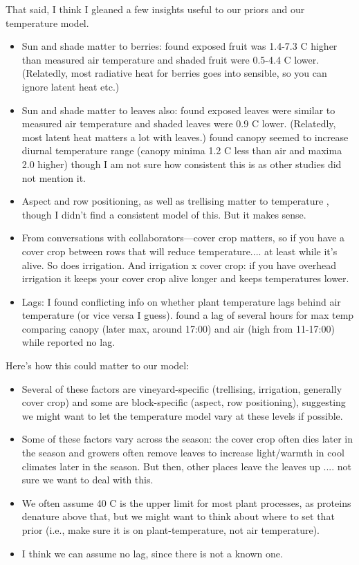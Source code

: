 \documentclass[11pt,letter]{article}
\newenvironment{smitemize}{
\begin{itemize}
  \setlength{\itemsep}{0pt}
  \setlength{\parskip}{0.8pt}
  \setlength{\parsep}{0pt}}
{\end{itemize}
}
\begin{document}
That said, I think I gleaned a few insights useful to our priors and our temperature model. 

\begin{smitemize}
\item Sun and shade matter to berries: \citet{millar1972} found exposed fruit was 1.4-7.3 C higher than measured air temperature and shaded fruit were 0.5-4.4 C lower. (Relatedly, most radiative heat for berries goes into sensible, so you can ignore latent heat etc.)
\item Sun and shade matter to leaves also: \citet{millar1972} found exposed leaves were similar to measured air temperature and shaded leaves were 0.9 C lower. (Relatedly, most latent heat matters a lot with leaves.) \citet{pena2020} found canopy seemed to increase diurnal temperature range (canopy minima 1.2 C less than air and maxima 2.0 higher) though I am not sure how consistent this is as other studies did not mention it. 
\item Aspect and row positioning, as well as trellising matter to temperature \citep{costa2019}, though I didn't find a consistent model of this. But it makes sense.
\item From conversations with collaborators---cover crop matters, so if you have a cover crop between rows that will reduce temperature.... at least while it's alive. So does irrigation. And irrigation x cover crop: if you have overhead irrigation it keeps your cover crop alive longer and keeps temperatures lower.
\item Lags: I found conflicting info on whether plant temperature lags behind air temperature (or vice versa I guess). \citet{costa2019} found a lag of several hours for max temp comparing canopy (later max, around 17:00) and air (high from 11-17:00) while \citet{pena2020} reported no lag.
\end{smitemize}

Here's how this could matter to our model:

\begin{smitemize}
\item Several of these factors are vineyard-specific (trellising, irrigation, generally cover crop) and some are block-specific (aspect, row positioning), suggesting we might want to let the temperature model vary at these levels if possible.
\item Some of these factors vary across the season: the cover crop often dies later in the season and growers often remove leaves to increase light/warmth in cool climates later in the season. But then, other places leave the leaves up .... not sure we want to deal with this. 
\item We often assume 40 C is the upper limit for most plant processes, as proteins denature above that, but we might want to think about where to set that prior (i.e., make sure it is on plant-temperature, not air temperature).
\item I think we can assume no lag, since there is not a known one. 
\end{smitemize}
\end{document}
